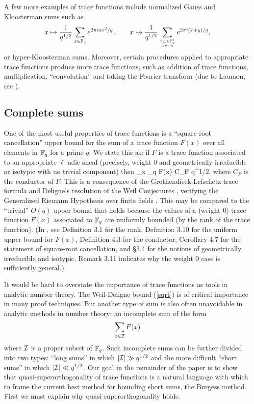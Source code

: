 \documentclass[oneside,11pt]{amsart}
\begin{document}
A few more examples of trace functions include normalized Gauss and Kloosterman sums such as 
\[ x \mapsto \frac{1}{q^{1/2}} \sum_{x \in \mathbb{F}_q} e^{2\pi i a x^2/q}, \qquad x \mapsto \frac{1}{q^{1/2}} \sum_{x,y \in \mathbb{F}_q^* \atop xy = a} e^{2\pi i (x+y)/q},
\]
or hyper-Kloosterman sums. Moreover, certain procedures applied to appropriate trace functions  produce more trace functions, such as addition of trace functions, multiplication, ``convolution'' and taking the Fourier transform (due to Laumon, see \cite[Thm. 6.6]{FKMS19}). 

\subsection{Complete sums}

One of the most useful properties of trace functions is  a ``square-root cancellation'' upper bound for the sum of a trace function $F(x)$ over all elements in $\mathbb{F}_q$ for a prime $q$. 
We state this as: if $F$ is a trace function associated to an appropriate $\ell$-adic sheaf (precisely, weight 0 and geometrically irreducible or isotypic with no trivial component) then  
\beq\label{sqrt}
 \sum_{x \in \F_q} F(x) \ll C_F q^{1/2},
 \eeq
where $C_F$ is the conductor of $F$. 
This is a consequence of the Grothendieck-Lefschetz trace formula \cite[Thm. 4.1]{FKMS19} and Deligne's resolution of the Weil Conjectures \cite{Del80}, verifying  the Generalized Riemann Hypothesis over finite fields \cite[Thm. 4.6]{FKMS19}.  
This may be compared to the  ``trivial'' $O(q)$ upper bound  that holds  because the values of  a (weight 0)  trace function $F(x)$ associated to $\mathbb{F}_q$ are uniformly bounded (by the rank of the trace function).  
 (In \cite{FKMS19}, see Definition 3.1 for the rank, Definition 3.10 for the uniform upper bound for $F(x)$, Definition 4.3 for the conductor,  Corollary 4.7 for the statement of square-root cancellation, and \S 3.4 for the notions of geometrically irreducible and isotypic. Remark 3.11 indicates why the weight 0 case is sufficiently general.)


It would be hard to overstate the importance of trace functions as tools in analytic number theory.
The Weil-Deligne bound  (\ref{sqrt}) is of critical importance in many proof techniques. But another type of sum is also often unavoidable in analytic methods in number theory: an incomplete sum of the form 
\[ \sum_{x \in \mathcal{I}} F(x) \]
where $\mathcal{I}$ is a proper subset of $\mathbb{F}_q$. 
Such incomplete sums can be further divided into two types: ``long sums'' in which $|\mathcal{I}| \gg q^{1/2}$ and the more difficult ``short sums'' in which $|\mathcal{I}| \ll q^{1/2}$. 
Our goal in the remainder of the paper is to show that quasi-superorthogonality of trace functions is a natural language with which to frame the current best method for bounding short sums, the Burgess method. First we must explain why quasi-superorthogonality holds.
\end{document}
